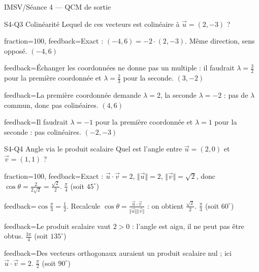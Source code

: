 \documentclass[11pt]{article}
\begin{document}
\begin{quiz}{IMSV/Séance 4 — QCM de sortie}
\begin{multi}[penalty=0, shuffle=true, numbering=abc,
  feedback={$\vec u$ et $\vec v$ (non nuls) sont colinéaires s'il existe un réel $\lambda$ tel que
  $\vec v = \lambda \cdot \vec u$, le \textbf{même} $\lambda$ pour toutes les coordonnées.
  Voir \emph{Colinéarité}.}]{S4-Q3 Colinéarité}
Lequel de ces vecteurs est colinéaire à $\vec u = (2, -3)$ ?
\item[fraction=100, feedback={Exact : $(-4, 6) = -2 \cdot (2, -3)$. Même direction, sens opposé.}]
  $(-4, 6)$
\item[feedback={Échanger les coordonnées ne donne pas un multiple : il faudrait $\lambda = \frac32$
  pour la première coordonnée et $\lambda = \frac23$ pour la seconde.}]
  $(3, -2)$
\item[feedback={La première coordonnée demande $\lambda = 2$, la seconde $\lambda = -2$ : pas de
  $\lambda$ commun, donc pas colinéaires.}]
  $(4, 6)$
\item[feedback={Il faudrait $\lambda = -1$ pour la première coordonnée et $\lambda = 1$ pour la
  seconde : pas colinéaires.}]
  $(-2, -3)$
\end{multi}

\begin{multi}[penalty=0, shuffle=true, numbering=abc,
  feedback={On calcule le produit scalaire en coordonnées, puis on l'égale à
  $\Vert\vec u\Vert \Vert\vec v\Vert \cos\theta$ avec $\theta \in [0, \pi]$. Le signe de
  $\vec u \cdot \vec v$ annonce déjà si l'angle est aigu, droit ou obtus.
  Voir \emph{Angles via le produit scalaire}.}]{S4-Q4 Angle via le produit scalaire}
Quel est l'angle entre $\vec u = (2, 0)$ et $\vec v = (1, 1)$ ?
\item[fraction=100, feedback={Exact : $\vec u \cdot \vec v = 2$, $\Vert\vec u\Vert = 2$,
  $\Vert\vec v\Vert = \sqrt2$, donc $\cos\theta = \frac{2}{2\sqrt2} = \frac{\sqrt2}{2}$.}]
  $\frac{\pi}{4}$ (soit $45^\circ$)
\item[feedback={$\cos\frac{\pi}{3} = \frac12$. Recalcule
  $\cos\theta = \frac{\vec u \cdot \vec v}{\Vert\vec u\Vert \Vert\vec v\Vert}$ : on obtient
  $\frac{\sqrt2}{2}$.}]
  $\frac{\pi}{3}$ (soit $60^\circ$)
\item[feedback={Le produit scalaire vaut $2 > 0$ : l'angle est aigu, il ne peut pas être obtus.}]
  $\frac{3\pi}{4}$ (soit $135^\circ$)
\item[feedback={Des vecteurs orthogonaux auraient un produit scalaire nul ; ici
  $\vec u \cdot \vec v = 2$.}]
  $\frac{\pi}{2}$ (soit $90^\circ$)
\end{multi}


\end{quiz}
\end{document}
